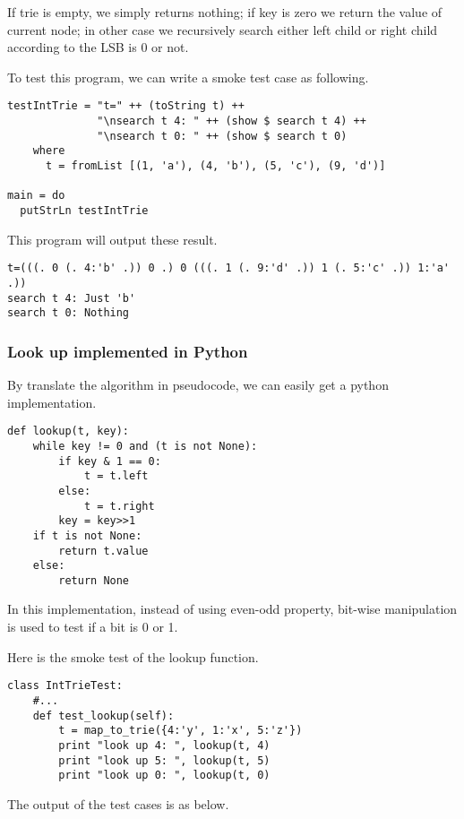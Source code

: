 \documentclass{article}
\begin{document}
If trie is empty, we simply returns nothing; if key is zero we return the 
value of current node; in other case we recursively search either left
child or right child according to the LSB is 0 or not.

To test this program, we can write a smoke test case as following.

\begin{lstlisting}
testIntTrie = "t=" ++ (toString t) ++ 
              "\nsearch t 4: " ++ (show $ search t 4) ++
              "\nsearch t 0: " ++ (show $ search t 0)
    where
      t = fromList [(1, 'a'), (4, 'b'), (5, 'c'), (9, 'd')]

main = do
  putStrLn testIntTrie
\end{lstlisting}

This program will output these result.

\begin{verbatim}
t=(((. 0 (. 4:'b' .)) 0 .) 0 (((. 1 (. 9:'d' .)) 1 (. 5:'c' .)) 1:'a' .))
search t 4: Just 'b'
search t 0: Nothing
\end{verbatim}

\subsubsection*{Look up implemented in Python}
By translate the algorithm in pseudocode, we can easily get a python 
implementation.

\lstset{language=Python}
\begin{lstlisting}
def lookup(t, key):
    while key != 0 and (t is not None):
        if key & 1 == 0:
            t = t.left
        else:
            t = t.right
        key = key>>1
    if t is not None:
        return t.value
    else:
        return None
\end{lstlisting}

In this implementation, instead of using even-odd property, bit-wise
manipulation is used to test if a bit is 0 or 1.

Here is the smoke test of the lookup function.

\begin{lstlisting}
class IntTrieTest:
    #...
    def test_lookup(self):
        t = map_to_trie({4:'y', 1:'x', 5:'z'})
        print "look up 4: ", lookup(t, 4)
        print "look up 5: ", lookup(t, 5)
        print "look up 0: ", lookup(t, 0)
\end{lstlisting}

The output of the test cases is as below.
\end{document}
